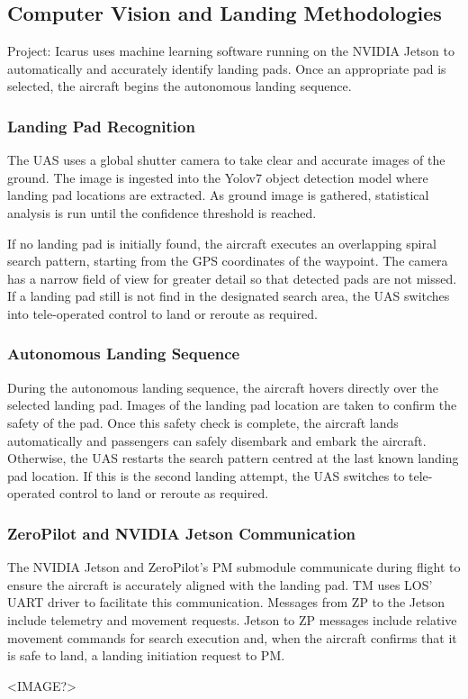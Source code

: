 \subsection{Computer Vision and Landing Methodologies}
\label{sec:cv-and-landing}

Project: Icarus uses machine learning software running on the NVIDIA Jetson to
automatically and accurately identify landing pads. Once an appropriate pad is selected,
the aircraft begins the autonomous landing sequence.

\subsubsection{Landing Pad Recognition}

The UAS uses a global shutter camera to take clear and accurate images of the ground.
The image is ingested into the Yolov7 object detection model where landing pad locations
are extracted. As ground image is gathered, statistical analysis is run until the
confidence threshold is reached.

If no landing pad is initially found, the aircraft executes an overlapping spiral
search pattern, starting from the GPS coordinates of the waypoint. The camera
has a narrow field of view for greater detail so that detected pads are not missed.
If a landing pad still is not find in the designated search area, the UAS switches
into tele-operated control to land or reroute as required.

\subsubsection{Autonomous Landing Sequence}
\label{sec:landing-sequence}

During the autonomous landing sequence, the aircraft hovers directly over the selected
landing pad. Images of the landing pad location are taken to confirm the safety
of the pad. Once this safety check is complete, the aircraft lands automatically and
passengers can safely disembark and embark the aircraft. Otherwise, the UAS restarts
the search pattern centred at the last known landing pad location. If this is the
second landing attempt, the UAS switches to tele-operated control to land or reroute
as required.

\subsubsection{ZeroPilot and NVIDIA Jetson Communication}
\label{sec:zp-jetson-communication}

The NVIDIA Jetson and ZeroPilot's PM submodule communicate during flight to ensure the
aircraft is accurately aligned with the landing pad. TM uses LOS' UART driver to
facilitate this communication. Messages from ZP to the Jetson include telemetry and
movement requests. Jetson to ZP messages include relative movement commands for search
execution and, when the aircraft confirms that it is safe to land, a landing initiation
request to PM.

<IMAGE?>